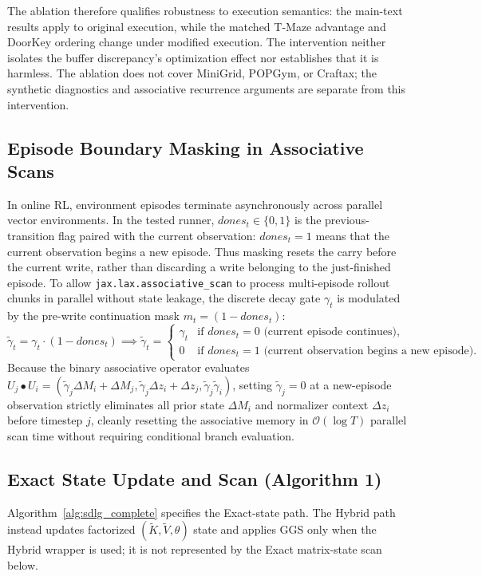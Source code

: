 The ablation therefore qualifies robustness to execution semantics: the main-text
results apply to original execution, while the matched T-Maze advantage and
DoorKey ordering change under modified execution. The intervention neither
isolates the buffer discrepancy's optimization effect nor establishes that it is
harmless. The ablation does not cover MiniGrid, POPGym, or Craftax; the synthetic
diagnostics and associative recurrence arguments are separate from this intervention.

\subsection{Episode Boundary Masking in Associative Scans}
\label{app:episode_masking}
In online RL, environment episodes terminate asynchronously across parallel vector environments. In the tested runner, $dones_t\in\{0,1\}$ is the previous-transition flag paired with the current observation: $dones_t=1$ means that the current observation begins a new episode. Thus masking resets the carry before the current write, rather than discarding a write belonging to the just-finished episode. To allow \texttt{jax.lax.associative\_scan} to process multi-episode rollout chunks in parallel without state leakage, the discrete decay gate $\gamma_t$ is modulated by the pre-write continuation mask $m_t = (1-dones_t)$:
\begin{equation}
\tilde{\gamma}_t = \gamma_t \cdot (1 - dones_t) \implies \tilde{\gamma}_t = \begin{cases} \gamma_t & \text{if } dones_t = 0 \text{ (current episode continues)}, \\ 0 & \text{if } dones_t = 1 \text{ (current observation begins a new episode)}. \end{cases}
\end{equation}
Because the binary associative operator evaluates $U_j \bullet U_i = (\tilde{\gamma}_j \Delta M_i + \Delta M_j, \tilde{\gamma}_j \Delta z_i + \Delta z_j, \tilde{\gamma}_j \tilde{\gamma}_i)$, setting $\tilde{\gamma}_j = 0$ at a new-episode observation strictly eliminates all prior state $\Delta M_i$ and normalizer context $\Delta z_i$ before timestep $j$, cleanly resetting the associative memory in $\mathcal{O}(\log T)$ parallel scan time without requiring conditional branch evaluation.

\clearpage
\subsection{Exact State Update and Scan (Algorithm 1)}
Algorithm~\ref{alg:sdlg_complete} specifies the Exact-state path. The Hybrid path instead updates factorized $(\widetilde K,\widetilde V,\theta)$ state and applies GGS only when the Hybrid wrapper is used; it is not represented by the Exact matrix-state scan below.

